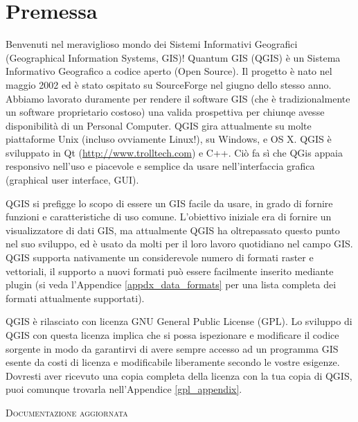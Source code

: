 
\section{Premessa}\label{label_forward}
\setcounter{page}{1}


Benvenuti nel meraviglioso mondo dei Sistemi Informativi Geografici (Geographical Information Systems, GIS)! Quantum GIS (QGIS) è un Sistema
Informativo Geografico a codice aperto (Open Source). Il progetto
è nato nel maggio 2002 ed è stato ospitato su SourceForge
nel giugno dello stesso anno. Abbiamo lavorato duramente per rendere
il software GIS (che è tradizionalmente un software proprietario costoso)
una valida prospettiva per chiunqe avesse disponibilità di un Personal
Computer. QGIS gira attualmente su molte piattaforme Unix (incluso ovviamente Linux!), su Windows,
e OS X. QGIS è sviluppato in Qt (\url{http://www.trolltech.com})
e C++. Ciò fa sì che QGis appaia responsivo nell'uso e piacevole e
semplice da usare nell'interfaccia grafica (graphical user interface,
GUI).

QGIS si prefigge lo scopo di essere un GIS facile da usare, in grado
di fornire funzioni e caratteristiche di uso comune. L’obiettivo iniziale
era di fornire un visualizzatore di dati GIS, ma attualmente QGIS ha oltrepassato questo
punto nel suo sviluppo, ed è usato da molti per il loro lavoro quotidiano nel campo GIS.
QGIS supporta nativamente un considerevole numero di formati raster e vettoriali,
il supporto a nuovi formati può essere facilmente inserito mediante
plugin (si veda l'Appendice \ref{appdx_data_formats} per una lista
completa dei formati attualmente supportati).

QGIS è rilasciato con licenza GNU General Public License (GPL). Lo
sviluppo di QGIS con questa licenza implica che si possa ispezionare
e modificare il codice sorgente in modo da garantirvi di avere sempre accesso
ad un programma GIS esente da costi di licenza e modificabile liberamente secondo le
vostre esigenze. Dovresti aver ricevuto una copia completa della licenza
con la tua copia di QGIS, puoi comunque trovarla nell'Appendice \ref{gpl_appendix}.



\begin{Tip}\caption{\textsc{Documentazione aggiornata}}
\end{Tip}

